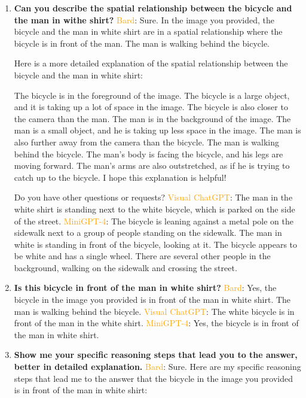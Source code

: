 \begin{enumerate}
    \item \textbf{Can you describe the spatial relationship between the bicycle and the man in withe shirt?}
    \subitem \textcolor{orange}{Bard}: Sure. In the image you provided, the bicycle and the man in white shirt are in a spatial relationship where the bicycle is in front of the man. The man is walking behind the bicycle.

    Here is a more detailed explanation of the spatial relationship between the bicycle and the man in white shirt:
    
    The bicycle is in the foreground of the image. The bicycle is a large object, and it is taking up a lot of space in the image. The bicycle is also closer to the camera than the man.
    The man is in the background of the image. The man is a small object, and he is taking up less space in the image. The man is also further away from the camera than the bicycle.
    The man is walking behind the bicycle. The man's body is facing the bicycle, and his legs are moving forward. The man's arms are also outstretched, as if he is trying to catch up to the bicycle.
    I hope this explanation is helpful!
    
    Do you have other questions or requests?
    \subitem \textcolor{orange}{Visual ChatGPT}: The man in the white shirt is standing next to the white bicycle, which is parked on the side of the street.
    \subitem \textcolor{orange}{MiniGPT-4}: The bicycle is leaning against a metal pole on the sidewalk next to a group of people standing on the sidewalk. The man in white is standing in front of the bicycle, looking at it. The bicycle appears to be white and has a single wheel. There are several other people in the background, walking on the sidewalk and crossing the street.
    \item \textbf{Is this bicycle in front of the man in white shirt?}
    \subitem \textcolor{orange}{Bard}: 
    Yes, the bicycle in the image you provided is in front of the man in white shirt. The man is walking behind the bicycle. 
    \subitem \textcolor{orange}{Visual ChatGPT}: The white bicycle is in front of the man in the white shirt.
    \subitem \textcolor{orange}{MiniGPT-4}: Yes, the bicycle is in front of the man in white shirt.
    \item \textbf{Show me your specific reasoning steps that lead you to the answer, better in detailed explanation.}
    \subitem \textcolor{orange}{Bard}: 
    Sure. Here are my specific reasoning steps that lead me to the answer that the bicycle in the image you provided is in front of the man in white shirt:


\end{enumerate}
